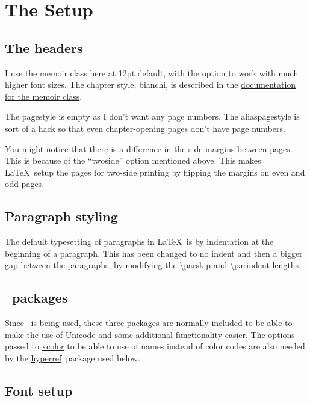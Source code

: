 \documentclass[a4paper,extrafontsizes,12pt,twoside,openany]{memoir}
\newcommand{\showpart}[1]{\noindent}
\newcommand{\HyperRef}{\href{http://www.tug.org/applications/hyperref/manual.html}{hyperref}\ }
\begin{document}
\chapter{The Setup}

\section{The headers}

I use the memoir class here at 12pt default, with the option to work with much higher font sizes. The chapter style,
bianchi, is described in the
\href{ftp://tug.ctan.org/pub/tex-archive/macros/latex/contrib/memoir/memman.pdf}{documentation for the memoir class}.

The pagestyle is empty as I don't want any page numbers. The aliaspagestyle is sort of a hack so that even
chapter-opening pages don't have page numbers.

You might notice that there is a difference in the side margins between pages. This is because of the ``twoside'' option
mentioned above. This makes \LaTeX\ setup the pages for two-side printing by flipping the margins on even and odd pages.

\showpart{HEADER}

\section{Paragraph styling}

The default typesetting of paragraphs in \LaTeX\ is by indentation at the beginning of a paragraph. This has been changed
to no indent and then a bigger gap between the paragraphs, by modifying the \textbackslash{}parskip and \textbackslash{}parindent lengths.

\showpart{PARAGRAPHSTYLES}

\section{\XeTeX\ packages}

Since \XeTeX\ is being used, these three packages are normally included to be able to make the use of Unicode and some additional
functionality easier. The options passed to \href{http://www.ukern.de/tex/xcolor.html}{xcolor} to be able to use of names
instead of color codes are also needed by the \HyperRef package used below.

\showpart{XETEXPACKAGES}

\section{Font setup}
\end{document}
